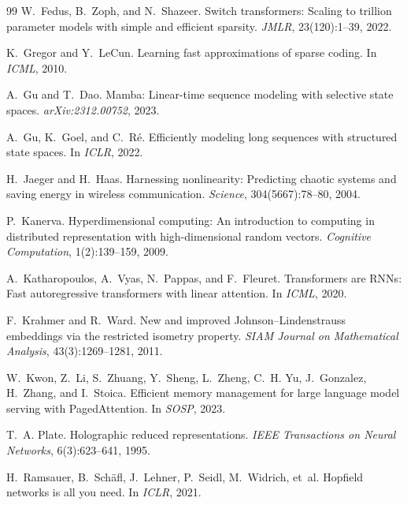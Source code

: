 \documentclass[11pt]{article}
\begin{document}
\begin{thebibliography}{99}
W.~Fedus, B.~Zoph, and N.~Shazeer.
\newblock Switch transformers: Scaling to trillion parameter models with simple and efficient sparsity.
\newblock \emph{JMLR}, 23(120):1--39, 2022.

K.~Gregor and Y.~LeCun.
\newblock Learning fast approximations of sparse coding.
\newblock In \emph{ICML}, 2010.

A.~Gu and T.~Dao.
\newblock Mamba: Linear-time sequence modeling with selective state spaces.
\newblock \emph{arXiv:2312.00752}, 2023.

A.~Gu, K.~Goel, and C.~R{\'e}.
\newblock Efficiently modeling long sequences with structured state spaces.
\newblock In \emph{ICLR}, 2022.

H.~Jaeger and H.~Haas.
\newblock Harnessing nonlinearity: Predicting chaotic systems and saving energy in wireless communication.
\newblock \emph{Science}, 304(5667):78--80, 2004.

P.~Kanerva.
\newblock Hyperdimensional computing: An introduction to computing in distributed representation with high-dimensional random vectors.
\newblock \emph{Cognitive Computation}, 1(2):139--159, 2009.

A.~Katharopoulos, A.~Vyas, N.~Pappas, and F.~Fleuret.
\newblock Transformers are RNNs: Fast autoregressive transformers with linear attention.
\newblock In \emph{ICML}, 2020.

F.~Krahmer and R.~Ward.
\newblock New and improved Johnson--Lindenstrauss embeddings via the restricted isometry property.
\newblock \emph{SIAM Journal on Mathematical Analysis}, 43(3):1269--1281, 2011.

W.~Kwon, Z.~Li, S.~Zhuang, Y.~Sheng, L.~Zheng, C.~H. Yu, J.~Gonzalez, H.~Zhang, and I.~Stoica.
\newblock Efficient memory management for large language model serving with PagedAttention.
\newblock In \emph{SOSP}, 2023.

T.~A. Plate.
\newblock Holographic reduced representations.
\newblock \emph{IEEE Transactions on Neural Networks}, 6(3):623--641, 1995.

H.~Ramsauer, B.~Sch{\"a}fl, J.~Lehner, P.~Seidl, M.~Widrich, et~al.
\newblock Hopfield networks is all you need.
\newblock In \emph{ICLR}, 2021.


\end{thebibliography}
\end{document}
